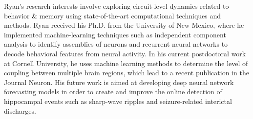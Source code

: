     
\begin{cventries}
\cventry
    {} %
    {} %
    {} %
    {} %
    {Ryan's research interests involve exploring circuit-level dynamics related to behavior \& memory using state-of-the-art computational techniques and methods. Ryan received his Ph.D. from the University of New Mexico, where he implemented machine-learning techniques such as independent component analysis to identify assemblies of neurons and recurrent neural networks to decode behavioral features from neural activity. In his current postdoctoral work at Cornell University, he uses machine learning methods to determine the level of coupling between multiple brain regions, which lead to a recent publication in the Journal Neuron. His future work is aimed at developing deep neural network forecasting models in order to create and improve the online detection of hippocampal events such as sharp-wave ripples and seizure-related interictal discharges.
    }
\end{cventries} 